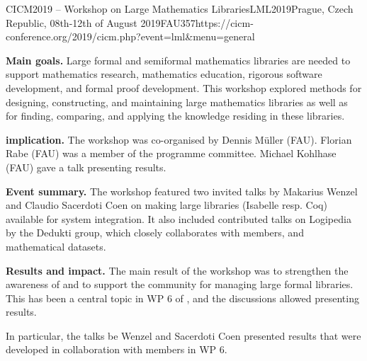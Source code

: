\begin{event}{CICM2019 -- Workshop on Large Mathematics Libraries}{LML2019}{Prague, Czech Republic, 08th-12th of August 2019}{FAU}{35}{7}{https://cicm-conference.org/2019/cicm.php?event=lml&menu=general}

\textbf{Main goals.}
Large formal and semiformal mathematics libraries are needed to support mathematics research, mathematics education, rigorous software development, and formal proof development.
This workshop explored methods for designing, constructing, and maintaining large mathematics libraries as well as for finding, comparing, and applying the knowledge residing in these libraries. 

\textbf{\ODK implication.}
The workshop was co-organised by Dennis M\"uller (FAU).
Florian Rabe (FAU) was a member of the programme committee.
Michael Kohlhase (FAU) gave a talk presenting \ODK results.

\textbf{Event summary.}
The workshop featured two invited talks by Makarius Wenzel and Claudio Sacerdoti Coen on making large libraries (Isabelle resp. Coq) available for system integration.
It also included contributed talks on Logipedia by the Dedukti group, which closely collaborates with \ODK members, and mathematical datasets.

\textbf{Results and impact.}
The main result of the workshop was to strengthen the awareness of and to support the community for managing large formal libraries.
This has been a central topic in WP 6 of \ODK, and the discussions allowed presenting \ODK results.

In particular, the talks be Wenzel and Sacerdoti Coen presented results that were developed in collaboration with \ODK members in WP 6.
\end{event}
